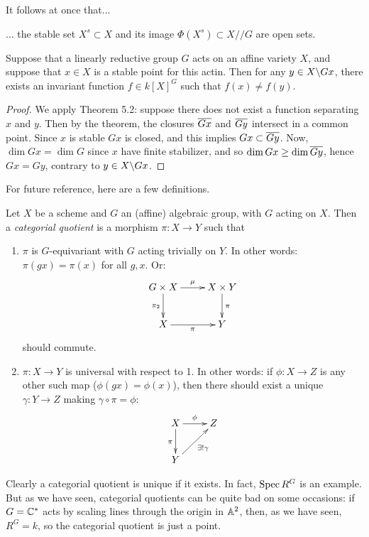 \documentclass[11pt, english]{article}
\begin{document}
It follows at once that...
\begin{prop}
... the stable set $X^s \subset X$ and its image $\Phi(X^s) \subset X /\!/ G$ are open sets.
\end{prop}

\begin{thm}
 Suppose that a linearly reductive group $G$ acts on an affine variety $X$, and suppose that $x \in X$ is a stable point for this actin. Then for any $y \in X \backslash Gx$, there exists an invariant function $f \in k[X] ^G$ such that $f(x) \neq f(y)$.
\end{thm}
\begin{proof}
 We apply Theorem 5.2: suppose there does not exist a function separating $x$ and $y$. Then by the theorem, the closures $\overline{Gx}$ and $\overline{Gy}$ intersect in a common point. Since $x$ is stable $Gx$ is closed, and this implies $Gx \subset \overline{Gy}$. Now, $\dim Gx=\dim G$ since $x$ have finite stabilizer, and so $\dim Gx \geq \dim \overline{Gy}$, hence $Gx=Gy$, contrary to $y \in X \backslash Gx$.
\end{proof}

For future reference, here are a few definitions.

\begin{defi}
 Let $X$ be a scheme and $G$ an (affine) algebraic group, with $G$ acting on $X$. Then a \emph{categorial quotient} is a morphism $\pi:X \to Y$ such that
 \begin{enumerate}
 \item $\pi$ is $G$-equivariant with $G$ acting trivially on $Y$. In other words: $\pi(gx)=\pi(x)$ for all $g,x$. Or:
\[
\xymatrix{
G \times X \ar[d]_{\pi_2} \ar[r]^\mu & X \times Y \ar[d]^\pi \\
X \ar[r]_\pi & Y
}
\]
should commute.
\item $\pi:X \to Y$ is universal with respect to 1. In other words: if $\phi:X \to Z$ is any other such map ($\phi(gx)=\phi(x)$), then there should exist a unique $\gamma:Y \to Z$ making $\gamma \circ \pi = \phi$:
\[
\xymatrix{
X \ar[r]^\phi \ar[d]_\pi & Z \\
Y \ar[ur]_{\exists ! \gamma}
}
\]
 \end{enumerate}
\end{defi}
Clearly a categorial quotient is unique if it exists. In fact, $\operatorname{Spec} R^G$ is an example. But as we have seen, categorial quotients can be quite bad on some occasions: if $G=\mathbb{C}^\ast$ acts by scaling lines through the origin in $\mathbb{A}^2$, then, as we have seen, $R^G=k$, so the categorial quotient is just a point.
\end{document}
